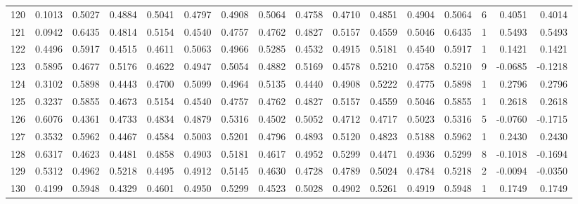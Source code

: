\begin{tabular}{lrrrrrrrrrrrrrrr}
120 &      0.1013 &  0.5027 &  0.4884 &  0.5041 &  0.4797 &  0.4908 &  0.5064 &  0.4758 &  0.4710 &  0.4851 &   0.4904 &     0.5064 &      6 &                    0.4051 &                     0.4014 \\
121 &      0.0942 &  0.6435 &  0.4814 &  0.5154 &  0.4540 &  0.4757 &  0.4762 &  0.4827 &  0.5157 &  0.4559 &   0.5046 &     0.6435 &      1 &                    0.5493 &                     0.5493 \\
122 &      0.4496 &  0.5917 &  0.4515 &  0.4611 &  0.5063 &  0.4966 &  0.5285 &  0.4532 &  0.4915 &  0.5181 &   0.4540 &     0.5917 &      1 &                    0.1421 &                     0.1421 \\
123 &      0.5895 &  0.4677 &  0.5176 &  0.4622 &  0.4947 &  0.5054 &  0.4882 &  0.5169 &  0.4578 &  0.5210 &   0.4758 &     0.5210 &      9 &                   -0.0685 &                    -0.1218 \\
124 &      0.3102 &  0.5898 &  0.4443 &  0.4700 &  0.5099 &  0.4964 &  0.5135 &  0.4440 &  0.4908 &  0.5222 &   0.4775 &     0.5898 &      1 &                    0.2796 &                     0.2796 \\
125 &      0.3237 &  0.5855 &  0.4673 &  0.5154 &  0.4540 &  0.4757 &  0.4762 &  0.4827 &  0.5157 &  0.4559 &   0.5046 &     0.5855 &      1 &                    0.2618 &                     0.2618 \\
126 &      0.6076 &  0.4361 &  0.4733 &  0.4834 &  0.4879 &  0.5316 &  0.4502 &  0.5052 &  0.4712 &  0.4717 &   0.5023 &     0.5316 &      5 &                   -0.0760 &                    -0.1715 \\
127 &      0.3532 &  0.5962 &  0.4467 &  0.4584 &  0.5003 &  0.5201 &  0.4796 &  0.4893 &  0.5120 &  0.4823 &   0.5188 &     0.5962 &      1 &                    0.2430 &                     0.2430 \\
128 &      0.6317 &  0.4623 &  0.4481 &  0.4858 &  0.4903 &  0.5181 &  0.4617 &  0.4952 &  0.5299 &  0.4471 &   0.4936 &     0.5299 &      8 &                   -0.1018 &                    -0.1694 \\
129 &      0.5312 &  0.4962 &  0.5218 &  0.4495 &  0.4912 &  0.5145 &  0.4630 &  0.4728 &  0.4789 &  0.5024 &   0.4784 &     0.5218 &      2 &                   -0.0094 &                    -0.0350 \\
130 &      0.4199 &  0.5948 &  0.4329 &  0.4601 &  0.4950 &  0.5299 &  0.4523 &  0.5028 &  0.4902 &  0.5261 &   0.4919 &     0.5948 &      1 &                    0.1749 &                     0.1749 \\

\end{tabular}
